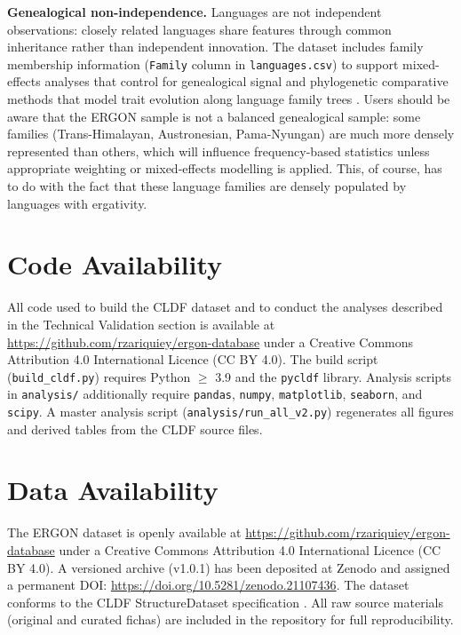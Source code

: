 \documentclass[12pt,a4paper]{article}
\begin{document}
\textbf{Genealogical non-independence.} Languages are not independent observations: closely related languages share features through common inheritance rather than independent innovation. The dataset includes family membership information (\texttt{Family} column in \texttt{languages.csv}) to support mixed-effects analyses that control for genealogical signal \cite{jaeger2011} and phylogenetic comparative methods that model trait evolution along language family trees \cite{greenhill2010,blasi2019}. Users should be aware that the ERGON sample is not a balanced genealogical sample: some families (Trans-Himalayan, Austronesian, Pama-Nyungan) are much more densely represented than others, which will influence frequency-based statistics unless appropriate weighting or mixed-effects modelling is applied. This, of course, has to do with the fact that these language families are densely populated by languages with ergativity.

\section{Code Availability}

All code used to build the CLDF dataset and to conduct the analyses described in the Technical Validation section is available at \url{https://github.com/rzariquiey/ergon-database} under a Creative Commons Attribution 4.0 International Licence (CC BY 4.0). The build script (\texttt{build\_cldf.py}) requires Python $\geq$ 3.9 and the \texttt{pycldf} library. Analysis scripts in \texttt{analysis/} additionally require \texttt{pandas}, \texttt{numpy}, \texttt{matplotlib}, \texttt{seaborn}, and \texttt{scipy}. A master analysis script (\texttt{analysis/run\_all\_v2.py}) regenerates all figures and derived tables from the CLDF source files.

\section{Data Availability}

The ERGON dataset is openly available at \url{https://github.com/rzariquiey/ergon-database} under a Creative Commons Attribution 4.0 International Licence (CC BY 4.0). A versioned archive (v1.0.1) has been deposited at Zenodo and assigned a permanent DOI: \url{https://doi.org/10.5281/zenodo.21107436}. The dataset conforms to the CLDF StructureDataset specification \cite{forkel2018}. All raw source materials (original and curated fichas) are included in the repository for full reproducibility.
\end{document}
